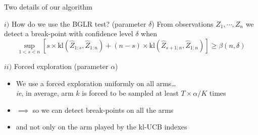 \documentclass[11pt,english,ignorenonframetext,]{beamer}
\begin{document}
\begin{frame}{Two details of our algorithm}



  \begin{exampleblock}{$i)$ How do we use the BGLR test? \hfill{} (parameter $\delta$)}
    From observations $Z_1,\cdots,Z_n$
    we detect a break-point
    with confidence level $\delta$
    when
      \[
        \sup_{1 < s < n} \left[s \times \mathrm{kl} \left( \widehat{Z}_{1:s}, \widehat{Z}_{1:n}\right) + (n-s) \times \mathrm{kl} \left( \widehat{Z}_{s+1:n}, \widehat{Z}_{1:n} \right) \right] \geq \beta(n,\delta)
        \]
  \end{exampleblock}

  \pause

  \begin{exampleblock}{$ii)$ Forced exploration \hfill{} (parameter $\alpha$)}
    \begin{itemize}
      \item We use a forced exploration uniformly on all arms\ldots\\
        \emph{ie}, in average, arm $k$ is forced to be sampled at least $T \times \alpha / K$ times
      \item $\implies$ so we can detect break-points on all the arms
      \item and not only on the arm played by the kl-UCB indexes
    \end{itemize}
  \end{exampleblock}

\end{frame}
\end{document}
